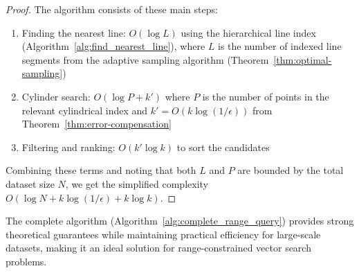 \documentclass[numbers,sort]{article}
\begin{document}
\begin{proof}
The algorithm consists of these main steps:
\begin{enumerate}
\item Finding the nearest line: $O(\log L)$ using the hierarchical line index (Algorithm~\ref{alg:find_nearest_line}), where $L$ is the number of indexed line segments from the adaptive sampling algorithm (Theorem~\ref{thm:optimal-sampling})
\item Cylinder search: $O(\log P + k')$ where $P$ is the number of points in the relevant cylindrical index and $k' = O(k\log(1/\epsilon))$ from Theorem~\ref{thm:error-compensation}
\item Filtering and ranking: $O(k'\log k)$ to sort the candidates
\end{enumerate}

Combining these terms and noting that both $L$ and $P$ are bounded by the total dataset size $N$, we get the simplified complexity $O(\log N + k\log(1/\epsilon) + k\log k)$.
\end{proof}

The complete algorithm (Algorithm~\ref{alg:complete_range_query}) provides strong theoretical guarantees while maintaining practical efficiency for large-scale datasets, making it an ideal solution for range-constrained vector search problems.
\end{document}
